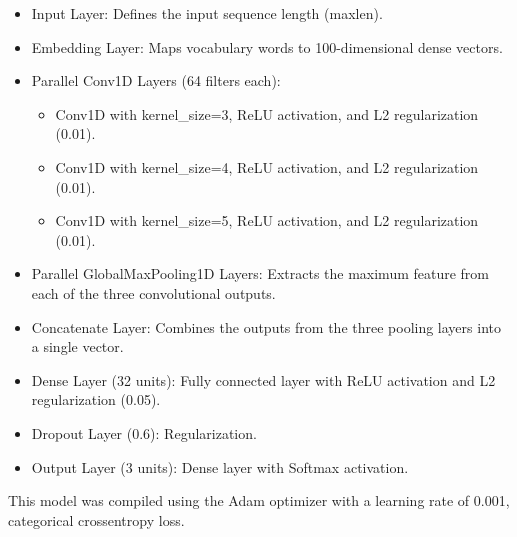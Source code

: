 \begin{itemize}
    \item Input Layer: Defines the input sequence length (maxlen).
    \item Embedding Layer: Maps vocabulary words to 100-dimensional dense vectors.
    \item Parallel Conv1D Layers (64 filters each):
     \begin{itemize}
 \item Conv1D with kernel\_size=3, ReLU activation, and L2 regularization (0.01).
     \item Conv1D with kernel\_size=4, ReLU activation, and L2 regularization (0.01).
     \item Conv1D with kernel\_size=5, ReLU activation, and L2 regularization (0.01).
     \end{itemize}
    \item Parallel GlobalMaxPooling1D Layers: Extracts the maximum feature from each of the three convolutional outputs.
    \item Concatenate Layer: Combines the outputs from the three pooling layers into a single vector.
    \item Dense Layer (32 units): Fully connected layer with ReLU activation and L2 regularization (0.05).
    \item Dropout Layer (0.6): Regularization.
    \item Output Layer (3 units): Dense layer with Softmax activation.
\end{itemize}

This model was compiled using the Adam optimizer with a learning rate of 0.001, categorical crossentropy loss.

